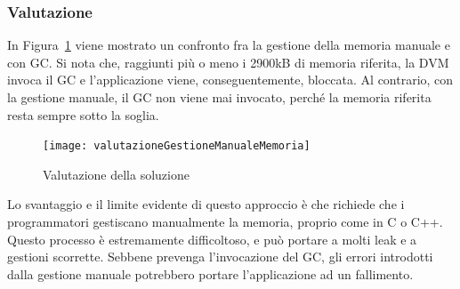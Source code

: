 \subsubsection{Valutazione}
In Figura~\ref{fig:valutazionegestionemanualememoria} viene mostrato un confronto fra la gestione della memoria manuale e con GC. Si nota che, raggiunti più o meno i 2900kB di memoria riferita, la DVM invoca il GC e l'applicazione viene, conseguentemente, bloccata. Al contrario, con la gestione manuale, il GC non viene mai invocato, perché la memoria riferita resta sempre sotto la soglia.
\begin{figure}[h]
	\centering
	\texttt{[image: valutazioneGestioneManualeMemoria]}
	\caption{Valutazione della soluzione}
	\label{fig:valutazionegestionemanualememoria}
\end{figure}

Lo svantaggio e il limite evidente di questo approccio è che richiede che i programmatori gestiscano manualmente la memoria, proprio come in C o C++. Questo processo è estremamente difficoltoso, e può portare a molti leak e a gestioni scorrette. Sebbene prevenga l'invocazione del GC, gli errori introdotti dalla gestione manuale potrebbero portare l'applicazione ad un fallimento.